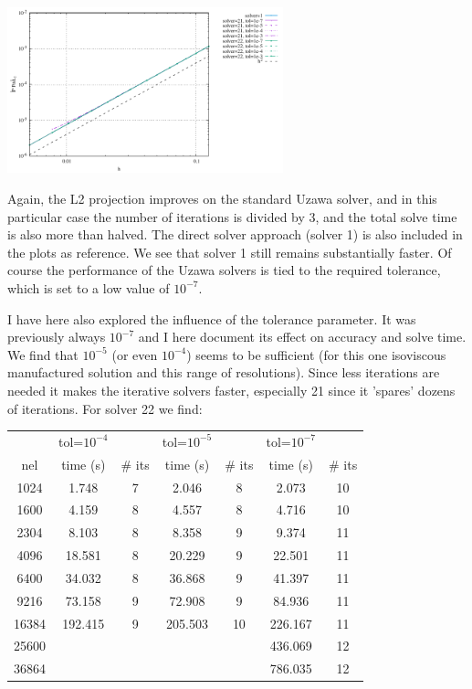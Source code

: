 \begin{center}
\includegraphics[width=8cm]{python_codes/fieldstone_147/RESULTS/L2/uzawa3/errorsP.pdf}
\end{center}

Again, the L2 projection improves on the standard Uzawa solver, and in 
this particular case the number of iterations is divided by 3, and the total solve 
time is also more than halved.
The direct solver approach (solver 1) is also included in the plots as reference. 
We see that solver 1 still remains substantially faster.
Of course the performance of the Uzawa solvers is tied to the required tolerance,
which is set to a low value of $10^{-7}$.

I have here also explored the influence of the tolerance parameter. 
It was previously always $10^{-7}$ and I here document its effect on 
accuracy and solve time. 
We find that $10^{-5}$ (or even $10^{-4}$) seems to be sufficient (for this one isoviscous manufactured solution
and this range of resolutions). Since less iterations are needed it makes the iterative 
solvers faster, especially 21 since it 'spares' dozens of iterations. 
For solver 22 we find:

\begin{center}
\begin{tabular}{|c|cc|cc|cc|}
\hline
& tol=$10^{-4}$ & & tol=$10^{-5}$ & & tol=$10^{-7}$ & \\
nel   & time (s) & \# its &  time (s) & \# its &  time (s) & \# its  \\ 
\hline
1024  & 1.748    &  7  &2.046  &   8  & 2.073    & 10 \\
1600  & 4.159    &  8  &4.557  &   8  & 4.716    & 10 \\
2304  & 8.103    &  8  &8.358  &   9  &  9.374   & 11 \\
4096  & 18.581   &  8  &20.229 &   9  &  22.501  & 11 \\
6400  & 34.032   &  8  &36.868 &   9  &  41.397  & 11 \\
9216  & 73.158   &  9  &72.908 &   9  &  84.936  & 11 \\
16384 & 192.415  &  9  &205.503&   10 &  226.167 & 11 \\
25600 &          &     &       &      &  436.069 & 12 \\
36864 &          &     &       &      &  786.035 & 12 \\
\hline
\end{tabular}
\end{center}


